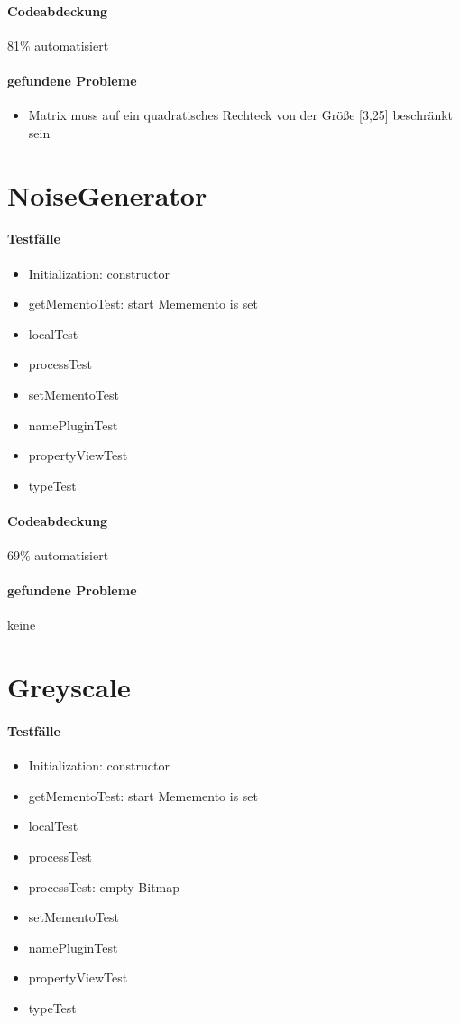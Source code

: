\paragraph*{Codeabdeckung}
81\% automatisiert

\paragraph*{gefundene Probleme}
\begin{itemize}
\item Matrix muss auf ein quadratisches Rechteck von der Größe [3,25] beschränkt sein
\end{itemize}

\section{NoiseGenerator}
\paragraph*{Testfälle}
\begin{itemize}
\item Initialization: constructor
\item getMementoTest: start Mememento is set
\item localTest
\item processTest
\item setMementoTest
\item namePluginTest
\item propertyViewTest
\item typeTest
\end{itemize}

\paragraph*{Codeabdeckung}
69\% automatisiert

\paragraph*{gefundene Probleme}
keine

\section{Greyscale}
\paragraph*{Testfälle}
\begin{itemize}
\item Initialization: constructor
\item getMementoTest: start Mememento is set
\item localTest
\item processTest
\item processTest: empty Bitmap
\item setMementoTest
\item namePluginTest
\item propertyViewTest
\item typeTest
\end{itemize}

